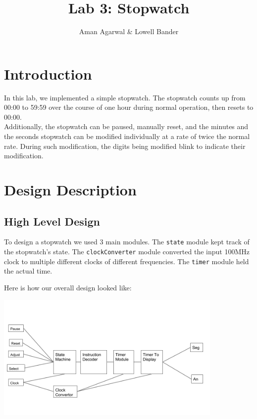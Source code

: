 \documentclass[]{article}
\newcommand{\subtitle}[1]{%
  \posttitle{%
    \par\end{center}
    \begin{center}\large#1\end{center}
    \vskip0.5em}%
}
\begin{document}
\title{Lab 3: Stopwatch}
\subtitle{CS M152A}
\author{Aman Agarwal \& Lowell Bander}

\maketitle
\tableofcontents \newpage

\section{Introduction}

In this lab, we implemented a simple stopwatch. The stopwatch counts up from 00:00 to 59:59 over the course of one hour during normal operation, then resets to 00:00. \\

Additionally, the stopwatch can be paused, manually reset, and the minutes and the seconds stopwatch can be modified individually at a rate of twice the normal rate. During such modification, the digits being modified blink to indicate their modification.

\section{Design Description}

\subsection{High Level Design}
\label{subsec:highlevel}

To design a stopwatch we used 3 main modules. The \texttt{state} module kept track of the stopwatch's state. The \texttt{clockConverter} module converted the input 100MHz clock to multiple different clocks of different frequencies. The \texttt{timer} module held the actual time.

Here is how our overall design looked like:

\includegraphics[width=11cm]{modularDesign.png}
\end{document}

